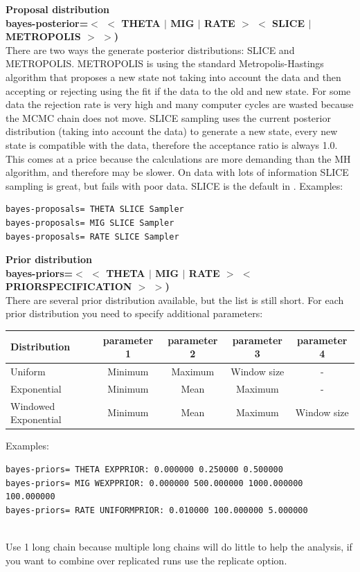\begin{description}
\item\textbf{ Proposal distribution\\
 bayes-posterior=$<$ $<$ THETA $|$ MIG $|$ RATE $>$ $<$ SLICE $|$ METROPOLIS $>$ $>$)}\\
There are two ways the generate posterior distributions: SLICE and METROPOLIS. METROPOLIS is using the standard Metropolis-Hastings algorithm that proposes a new state not taking into account the data and then accepting or rejecting using the fit if the data to the old and new state. For some data the rejection rate is very high and many computer cycles are wasted because the MCMC chain does not move. SLICE sampling uses the current posterior distribution (taking into account the data) to generate a new state, every new state is compatible with the data, therefore the acceptance ratio is always 1.0. This comes at a price because the calculations are more demanding than the MH algorithm, and therefore may be slower. On data with lots of information SLICE sampling is great, but fails with poor data.
SLICE is the default in \migrate.
\vskip 0.5cm
Examples:\begin{small}
\begin{verbatim}
bayes-proposals= THETA SLICE Sampler
bayes-proposals= MIG SLICE Sampler
bayes-proposals= RATE SLICE Sampler
\end{verbatim}
\end{small}

\item\textbf{ Prior distribution\\
 bayes-priors=$<$ $<$ THETA $|$ MIG $|$ RATE $>$ $<$ PRIORSPECIFICATION $>$ $>$)}\\
There are several prior distribution available, but the list is still short. 
For each prior distribution you need to specify additional parameters:

\begin{tabular}{l c c c c}
Distribution & parameter 1 & parameter 2 & parameter 3 & parameter 4\\
\hline
Uniform & Minimum & Maximum & Window size & -\\
Exponential & Minimum & Mean & Maximum & -\\
Windowed Exponential & Minimum & Mean & Maximum & Window size\\
\hline
\end{tabular}
\vskip 0.5cm
Examples:\begin{small}
\vskip -0.5cm
\begin{verbatim}
bayes-priors= THETA EXPPRIOR: 0.000000 0.250000 0.500000 
bayes-priors= MIG WEXPPRIOR: 0.000000 500.000000 1000.000000 100.000000 
bayes-priors= RATE UNIFORMPRIOR: 0.010000 100.000000 5.000000 
\end{verbatim}
\end{small}
\item{}\\
Use 1 long chain because multiple long chains will do little to help the analysis, if you want to combine over replicated runs use the replicate option.


\end{description}
